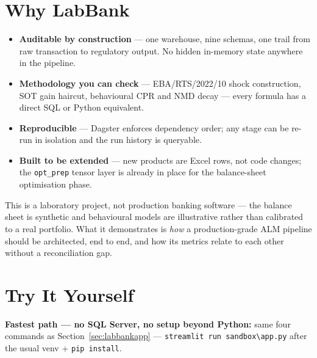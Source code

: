 \documentclass[11pt,a4paper]{article}
\begin{document}
\section{Why LabBank}

\begin{itemize}[itemsep=3pt]
  \item \textbf{Auditable by construction} --- one warehouse, nine schemas, one
        trail from raw transaction to regulatory output. No hidden in-memory
        state anywhere in the pipeline.
  \item \textbf{Methodology you can check} --- EBA/RTS/2022/10 shock
        construction, SOT gain haircut, behavioural CPR and NMD decay
        --- every formula has a direct SQL or Python equivalent.
  \item \textbf{Reproducible} --- Dagster enforces dependency order; any stage
        can be re-run in isolation and the run history is queryable.
  \item \textbf{Built to be extended} --- new products are Excel rows, not code
        changes; the \texttt{opt\_prep} tensor layer is already in place for the
        balance-sheet optimisation phase.
\end{itemize}

\begin{pitchbox}
This is a laboratory project, not production banking software --- the balance
sheet is synthetic and behavioural models are illustrative rather than
calibrated to a real portfolio. What it demonstrates is \textit{how} a
production-grade ALM pipeline should be architected, end to end, and how its
metrics relate to each other without a reconciliation gap.
\end{pitchbox}

\section{Try It Yourself}
\label{sec:tryityourself}

\textbf{Fastest path --- no SQL Server, no setup beyond Python:} same four
commands as Section~\ref{sec:labbankapp} --- \texttt{streamlit run
sandbox\textbackslash app.py} after the usual venv + \texttt{pip install}.
\end{document}
